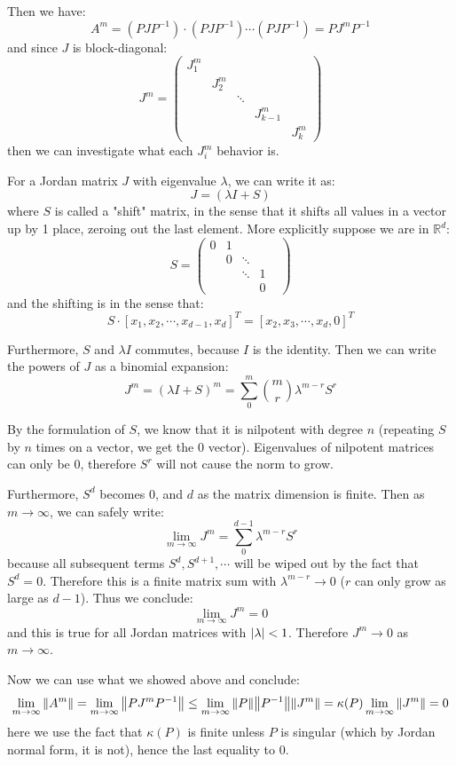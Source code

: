 \documentclass[12pt]{article} %
\newcommand{\rr}{\mathbb{R}}
\newcommand{\ntoinf}[1]{\lim_{{#1}\rightarrow \infty}}
\newcommand{\ka}{\kappa}
\newcommand{\1}[1]{\mathds{1}\left[#1\right]}
\begin{document}
Then we have:
$$
	A^m = (PJP^{-1})\cdot(PJP^{-1})\cdots (PJP^{-1}) = PJ^mP^{-1}
$$ and since $J$ is block-diagonal:
$$
	J^m = 
	\begin{pmatrix}
		J_1^m & & & & \\
		& J_2^m & & & \\
		& & \ddots & & \\
		& & & J_{k-1}^m & \\
		& & & & J_k^m
	\end{pmatrix}
$$ then we can investigate what each $J_i^m$ behavior is. 


For a Jordan matrix $J$ with eigenvalue $\lambda$, we can write it as:
$$
	J = (\lambda I + S)
$$ where $S$ is called a "shift" matrix, in the sense that it shifts all values in a vector up by 1 place, zeroing out the last element. More explicitly suppose we are in $\rr^d$:
$$
	S = 
	\begin{pmatrix}
		0 & 1 & & \\
		& 0 & \ddots & \\
		& & \ddots & 1& \\
		& & & 0
	\end{pmatrix}
$$ and the shifting is in the sense that:
$$
S\cdot [x_1, x_2,\cdots, x_{d-1}, x_d]^T = [x_2, x_3,\cdots, x_{d}, 0]^T
$$

Furthermore, $S$ and $\lambda I$ commutes, because $I$ is the identity. Then we can write the powers of $J$ as a binomial expansion:
$$
J^m = (\lambda I + S)^m = \sum_{0}^m {m\choose r}\lambda^{m-r}S^r
$$	

By the formulation of $S$, we know that it is nilpotent with degree $n$ (repeating $S$ by $n$ times on a vector, we get the 0 vector). Eigenvalues of nilpotent matrices can only be 0, therefore $S^r$ will not cause the norm to grow. 

Furthermore, $S^d$ becomes 0, and $d$ as the matrix dimension is finite. Then as $m\rightarrow\infty$, we can safely write:
$$
	\ntoinf{m}J^m = \sum_0^{d-1}\lambda^{m-r}S^r
$$ because all subsequent terms $S^d, S^{d+1},\cdots$ will be wiped out by the fact that $S^d = 0$. Therefore this is a finite matrix sum with $\lambda^{m-r}\rightarrow 0$ ($r$ can only grow as large as $d-1$). Thus we conclude:
$$
	\ntoinf{m}J^m = 0
$$ and this is true for all Jordan matrices with $\abs{\lambda}<1$. Therefore $J^m \rightarrow 0$ as $m\rightarrow \infty$.

Now we can use what we showed above and conclude:
$$
	\ntoinf{m}\norm{A^m} = \ntoinf{m}\norm{PJ^mP^{-1}} \le \ntoinf{m}\norm{P}\norm{P^{-1}}\norm{J^m} = \ka(P)\ntoinf{m}\norm{J^m} = 0
$$ here we use the fact that $\ka(P)$ is finite unless $P$ is singular (which by Jordan normal form, it is not), hence the last equality to 0.
\newpage
\end{document}
